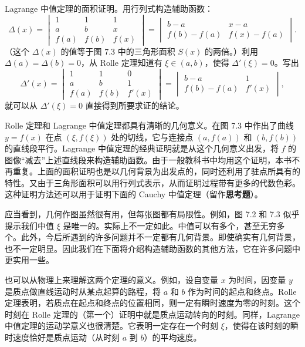 \begin{xproof}
Lagrange 中值定理的面积证明。用行列式构造辅助函数：
\begin{equation}
  \Delta(x)=
  \begin{vmatrix}
    1&1&1\\
    a&b&x\\
    f(a)&f(b)&f(x)
  \end{vmatrix}
  =
  \begin{vmatrix}
    b-a&x-a\\
    f(b)-f(a)&f(x)-f(a)
  \end{vmatrix}.
  \tag{7.6}
\end{equation}
（这个 $\Delta(x)$ 的值等于图 7.3 中的三角形面积 $S(x)$ 的两倍。）利用 $\Delta(a)=\Delta(b)=0$，从 Rolle 定理知道有 $\xi\in(a,b)$，使得 $\Delta'(\xi)=0$。写出
\[
  \Delta'(x)=
  \begin{vmatrix}
    1&1&0\\
    a&b&1\\
    f(a)&f(b)&f'(x)
  \end{vmatrix}
  =
  \begin{vmatrix}
    b-a&1\\
    f(b)-f(a)&f'(x)
  \end{vmatrix},
\]
就可以从 $\Delta'(\xi)=0$ 直接得到所要求证的结论。
\end{xproof}

\begin{xremark}
Rolle 定理和 Lagrange 中值定理都具有清晰的几何意义。在图 7.3 中作出了曲线 $y=f(x)$ 在点 $(\xi,f(\xi))$ 处的切线，它与连接点 $(a,f(a))$ 和 $(b,f(b))$ 的直线段平行。Lagrange 中值定理的经典证明就是从这个几何意义出发，将 $f$ 的图像“减去”上述直线段来构造辅助函数。由于一般教科书中均用这个证明，本书不再重复。上面的面积证明也是以几何背景为出发点的，同时还利用了驻点所具有的特性。又由于三角形面积可以用行列式表示，从而证明过程带有更多的代数色彩。这种证明方法还可以用于证明下面的 Cauchy 中值定理（留作\textbf{思考题}）。

应当看到，几何作图虽然很有用，但每张图都有局限性。例如，图 7.2 和 7.3 似乎提示我们中值 $\xi$ 是唯一的。实际上不一定如此。中值可以有多个，甚至无穷多个。此外，今后所遇到的许多问题并不一定都有几何背景。即使确实有几何背景，也不一定明显。因此我们在下面将介绍构造辅助函数的其他方法，它在许多问题中更实用一些。
\end{xremark}

\begin{xremark}
也可以从物理上来理解这两个定理的意义。例如，设自变量 $x$ 为时间，因变量 $y$ 是质点做直线运动时从某点起算的路程，将 $a$ 和 $b$ 作为时间的起点和终点。Rolle 定理表明，若质点在起点和终点的位置相同，则一定有瞬时速度为零的时刻。这个时刻在 Rolle 定理的（第一个）证明中就是质点运动转向的时刻。同样，Lagrange 中值定理的运动学意义也很清楚。它表明一定存在一个时刻 $\xi$，使得在该时刻的瞬时速度恰好是质点运动（从时刻 $a$ 到 $b$）的平均速度。
\end{xremark}

